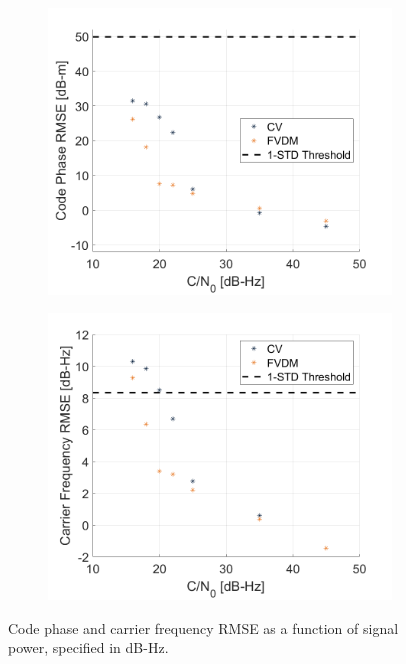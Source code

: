 \begin{figure}[!ht]
    \begin{subfigure}{.45\textwidth}
        \centering
        \includegraphics[width=1\linewidth]{Figures/dynamic/codephaseRMSEdyn.png}
    \end{subfigure}%
    \begin{subfigure}{.45\textwidth}
        \centering
        \includegraphics[width=1\linewidth]{Figures/dynamic/carrFreqRMSEdyn.png}
    \end{subfigure}
    \caption{Code phase and carrier frequency RMSE as a function of signal power, specified in dB-Hz.}\label{fig:codecarrierdyn}
\end{figure}

